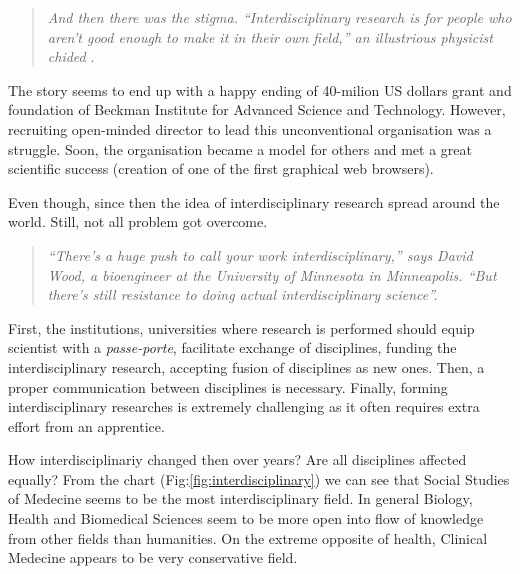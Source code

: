 \documentclass[12pt,]{book}
\theoremstyle{definition}
\theoremstyle{definition}
\theoremstyle{definition}
\theoremstyle{remark}
\begin{document}
\begin{quote}
\emph{And then there was the stigma. ``Interdisciplinary research is for
people who aren't good enough to make it in their own field,'' an
illustrious physicist chided} \citep{Ledford2015}.
\end{quote}

The story seems to end up with a happy ending of 40-milion US dollars
grant and foundation of Beckman Institute for Advanced Science and
Technology. However, recruiting open-minded director to lead this
unconventional organisation was a struggle. Soon, the organisation
became a model for others and met a great scientific success (creation
of one of the first graphical web browsers).

Even though, since then the idea of interdisciplinary research spread
around the world. Still, not all problem got overcome.

\begin{quote}
\emph{``There's a huge push to call your work interdisciplinary,'' says
David Wood, a bioengineer at the University of Minnesota in Minneapolis.
``But there's still resistance to doing actual interdisciplinary
science''.}
\end{quote}

First, the institutions, universities where research is performed should
equip scientist with a \emph{passe-porte}, facilitate exchange of
disciplines, funding the interdisciplinary research, accepting fusion of
disciplines as new ones. Then, a proper communication between
disciplines is necessary. Finally, forming interdisciplinary researches
is extremely challenging as it often requires extra effort from an
apprentice.

How interdisciplinariy changed then over years? Are all disciplines
affected equally? From the chart (Fig:\ref{fig:interdisciplinary}) we
can see that Social Studies of Medecine seems to be the most
interdisciplinary field. In general Biology, Health and Biomedical
Sciences seem to be more open into flow of knowledge from other fields
than humanities. On the extreme opposite of health, Clinical Medecine
appears to be very conservative field.
\end{document}
